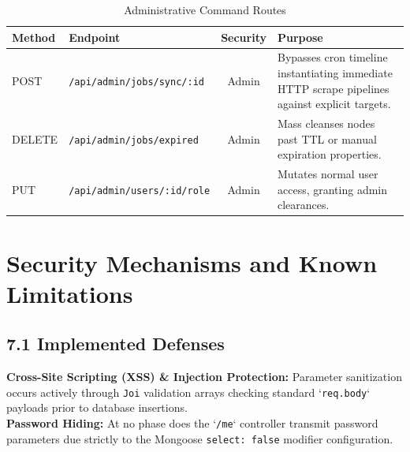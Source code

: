 \documentclass[12pt,a4paper,oneside]{report}
\begin{document}
\begin{table}[H]
\centering
\caption{Administrative Command Routes}
\renewcommand{\arraystretch}{1.5}
\begin{tabularx}{\textwidth}{|l|l|c|X|}
\hline
\textbf{Method} & \textbf{Endpoint} & \textbf{Security} & \textbf{Purpose} \\ 
\hline
POST & \texttt{/api/admin/jobs/sync/:id} & Admin & Bypasses cron timeline instantiating immediate HTTP scrape pipelines against explicit targets.\\
\hline
DELETE & \texttt{/api/admin/jobs/expired} & Admin & Mass cleanses nodes past TTL or manual expiration properties.\\
\hline
PUT & \texttt{/api/admin/users/:id/role} & Admin & Mutates normal user access, granting admin clearances.\\
\hline
\end{tabularx}
\end{table}

\chapter{Security Mechanisms and Known Limitations}

\section{7.1 Implemented Defenses}
\textbf{Cross-Site Scripting (XSS) \& Injection Protection:} Parameter sanitization occurs actively through \texttt{Joi} validation arrays checking standard `\texttt{req.body}` payloads prior to database insertions. \\
\textbf{Password Hiding:} At no phase does the `\texttt{/me}` controller transmit password parameters due strictly to the Mongoose \texttt{select: false} modifier configuration.
\end{document}
